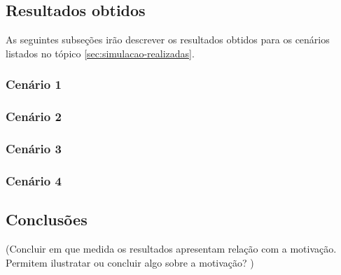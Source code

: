 \subsection{Resultados obtidos}
As seguintes subseções irão descrever os resultados obtidos para os cenários
listados no tópico \ref{sec:simulacao-realizadas}.

\subsubsection{Cenário 1}
\label{subsub:cenario1}


\subsubsection{Cenário 2}
\label{subsub:cenario2}


\subsubsection{Cenário 3}
\label{subsub:cenario3}


\subsubsection{Cenário 4}
\label{subsub:cenario4}


\subsection{Conclusões}
(Concluir em que medida os resultados apresentam relação com a motivação.
Permitem ilustratar ou concluir algo sobre a motivação? )